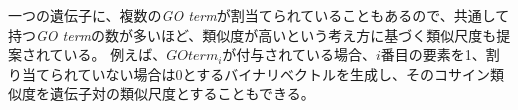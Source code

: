 \documentclass[titlepage,12pt]{jreport}
\def\ex{\noindent{{\bf 例}：}}
\begin{document}
一つの遺伝子に、複数の{\it GO term}が割当てられていることもあるので、共通して持つ{\it GO term}の数が多いほど、類似度が高いという考え方に基づく類似尺度も提案されている。 例えば、$GO term_i$が付与されている場合、$i$番目の要素を1、割り当てられていない場合は0とするバイナリベクトルを生成し、そのコサイン類似度を遺伝子対の類似尺度とすることもできる。

\end{document}
